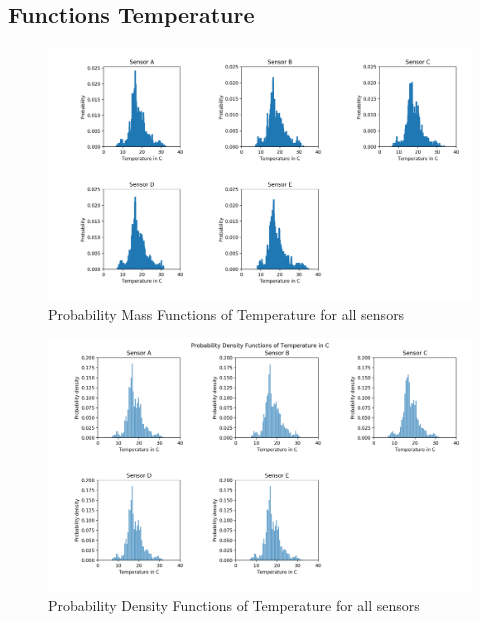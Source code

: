 \documentclass{article}
\begin{document}
        \subsection{Functions Temperature}
            \begin{figure}
                \includegraphics[width=\textwidth]{pmf_temp}
                \caption{Probability Mass Functions of Temperature for all sensors}
            \end{figure}

            \begin{figure}
                \includegraphics[width=\textwidth]{pdf_temp}
                \caption{Probability Density Functions of Temperature for all sensors}
            \end{figure}
\end{document}
